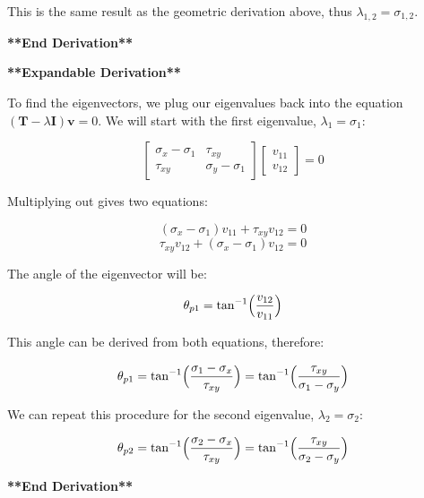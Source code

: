  \noindent This is the same result as the geometric derivation above, thus $\lambda_{1,2} = \sigma_{1,2}$.                     

\vspace{5pt}

\noindent \textbf{**End Derivation**}

\vspace{5pt}

\noindent \textbf{**Expandable Derivation**}

\vspace{5pt}

\noindent To find the eigenvectors, we plug our eigenvalues back into the equation $(\boldsymbol{T}-\lambda\boldsymbol{I})\boldsymbol{v} = 0$. We will start with the first eigenvalue, $\lambda_1 = \sigma_1$:

\[\begin{bmatrix}
\sigma_{x}-\sigma_{1} & \tau_{xy}\\
\tau_{xy} & \sigma_{y}-\sigma_{1}
\end{bmatrix}
\begin{bmatrix}
v_{11} \\
v_{12}
\end{bmatrix}
= 0\]
                      
\noindent Multiplying out gives two equations:

\[(\sigma_{x}-\sigma_{1})v_{11} + \tau_{xy}v_{12} = 0\]
\[\tau_{xy}v_{12} + (\sigma_{x}-\sigma_{1})v_{12} = 0\]

                      
\noindent The angle of the eigenvector will be:

\[\theta_{p1} = \tan^{-1}\Bigl(\frac{v_{12}}{v_{11}}\Bigr)\]

\noindent This angle can be derived from both equations, therefore:

\[\theta_{p1} = \tan^{-1}\Bigl(\frac{\sigma_1 - \sigma_x}{\tau_{xy}}\Bigr) = \tan^{-1}\Bigl(\frac{\tau_{xy}}{\sigma_1 - \sigma_y}\Bigr)\]

\noindent We can repeat this procedure for the second eigenvalue, $\lambda_2 = \sigma_2$:

\[\theta_{p2} = \tan^{-1}\Bigl(\frac{\sigma_2 - \sigma_x}{\tau_{xy}}\Bigr) = \tan^{-1}\Bigl(\frac{\tau_{xy}}{\sigma_2 - \sigma_y}\Bigr)\]

\noindent \textbf{**End Derivation**}
 \clearpage
\subsection{}

